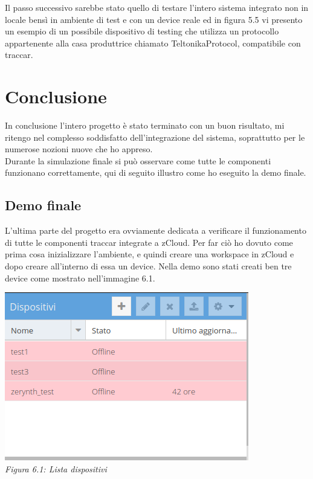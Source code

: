 \documentclass[a4paper,titlepage,12pt]{book}
\begin{document}
{Il passo successivo sarebbe stato quello di testare l'intero sistema integrato non in locale bensì in ambiente di test e con un device reale ed in figura 5.5 vi presento un esempio di un possibile dispositivo di testing che utilizza un protocollo appartenente alla casa produttrice chiamato TeltonikaProtocol, compatibile con traccar.\\


\chapter{
Conclusione}
In conclusione l'intero progetto è stato terminato con un buon risultato, mi ritengo nel complesso soddisfatto dell'integrazione del sistema, soprattutto per le numerose nozioni nuove che ho appreso.\\
Durante la simulazione finale si può osservare come tutte le componenti funzionano correttamente, qui di seguito illustro come ho eseguito la demo finale.

\section{
Demo finale}
L'ultima parte del progetto era ovviamente dedicata a verificare il funzionamento di tutte le componenti traccar integrate a zCloud. Per far ciò ho dovuto come prima cosa inizializzare l'ambiente, e quindi creare una workspace in zCloud e dopo creare all'interno di essa un device. Nella demo sono stati creati ben tre device come mostrato nell'immagine 6.1.



\begin{center}
\includegraphics[scale=0.53]{images/dev.png}\\ 
\textit{Figura 6.1: Lista dispositivi}
\end{center}

}
\end{document}
